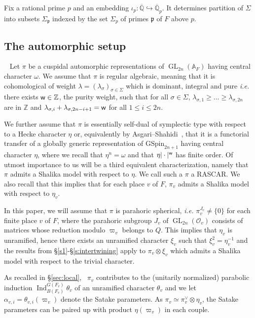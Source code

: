 \documentclass{amsart}
\theoremstyle{definition}
\newcommand{\A}{\mathbb{A}}
\newcommand{\Q}{\mathbb{Q}}
\newcommand{\Z}{\mathbb{Z}}
\newcommand{\cO}{\mathcal{O}}
\newcommand{\Ind}{\operatorname{Ind}}
\newcommand{\GL}{\operatorname{GL}}
\newcommand{\sw}{{\sf{w}}}
\begin{document}
{Fix a rational prime $p$ and an embedding $\iota_p : \overline{\Q} \hookrightarrow \overline{\Q}_p$. It determines partition of $\Sigma$ into subsets 
$\Sigma_\mathfrak{p}$ indexed by the set  $\Sigma_p$ of primes $\mathfrak{p}$ of $F$ above $p$.  



\subsection{The automorphic setup} \label{sec:setup} 
Let $\pi$ be a cuspidal automorphic representations of $\GL_{2n}(\A_F)$ having central character $\omega$.
We assume that $\pi$  is regular algebraic, meaning that it is cohomological of weight
$\lambda= (\lambda_{\sigma})_{\sigma \in \Sigma}$ which is dominant, integral and pure 
{\it i.e.} there exists $\sw  \in \Z$, the purity weight, such that  for all $\sigma \in \Sigma$,  $\lambda_{\sigma, 1}\geqslant  \dots \geqslant \lambda_{\sigma, 2n}$ are in $\Z$ and  $\lambda_{\sigma, i}+ \lambda_{\sigma, 2n- i+ 1}= \sw$   for all  $1 \leqslant  i \leqslant  2n$. 

We further assume that $\pi$ is essentially self-dual of symplectic type with respect to a Hecke character $\eta$ or, equivalently by Asgari--Shahidi~\cite{AS06}, that it is a functorial transfer of a globally generic representation of $\mathrm{GSpin}_{2n+1}$ having central character $\eta$, 
where we recall that $\eta^n=\omega$ and that $\eta |\cdot |^{\sw}$ has finite order. 
 Of utmost importance to us will be a third equivalent characterization, namely that $\pi$ admits a Shalika model with respect to $\eta$. 
 We call such a $\pi$ a RASCAR.  We also recall that this implies that for each place $v$ of $F$,  $\pi_v$ admits a Shalika model with respect to $\eta_v$. 

In this paper, we will assume that $\pi$ is parahoric spherical,  {\it i.e.}  $\pi_v^{J_v}\ne \{0\} $ for each finite place $v$ of $F$, where the parahoric subgroup $J_v$ of $\GL_{2n}(\cO_v)$ consists of matrices whose reduction modulo $\varpi_v$ belongs to $Q$. This implies that $\eta_v$ is unramified, hence there exists an unramified character $\xi_v$ such that $\xi_v^2=\eta_v^{-1}$ and the results from \S\ref{s1}-\S\ref{s:intertwining} apply to  $\pi_v\otimes \xi_v$  which admits  a Shalika model with respect to the trivial character.  

As recalled in \S\ref{sec:local},  $\pi_v$ contributes to the (unitarily normalized)  parabolic induction $\Ind_{B(F_v)}^{G(F_v)}\theta_v$ of an unramified character $\theta_v$ and we let $\alpha_{v,i}=\theta_{v,i}(\varpi_v)$ denote the Satake parameters. As $\pi_v\simeq\pi_v^\vee\otimes \eta_v$, the Satake parameters 
can be paired up with product $\eta(\varpi_v)$ in each couple.  

}
\end{document}
